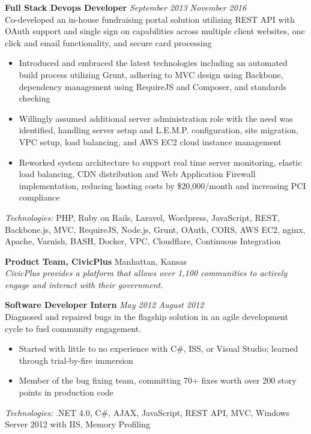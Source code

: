 \documentclass[10pt]{extarticle}
\begin{document}
\begin{addmargin}[1em]{0em}
  \textbf{Full Stack Devops Developer} \hfill \textit{September 2013 \textendash{} November 2016} \\
  Co-developed an in-house fundraising portal solution utilizing REST API with OAuth support and single sign on capabilities across multiple client websites, one click and email functionality, and secure card processing \\
  \vspace{-1.1em}
  \begin{itemize}
    \item Introduced and embraced the latest technologies including an automated build process utilizing Grunt, adhering to MVC design using Backbone, dependency management using RequireJS and Composer, and standards checking
    \item Willingly assumed additional server administration role with the need was identified, handling server setup and L.E.M.P. configuration, site migration, VPC setup, load balancing, and AWS EC2 cloud instance management
    \item Reworked system architecture to support real time server monitoring, elastic load balancing, CDN distribution and Web Application Firewall implementation, reducing hosting costs by \$20,000/month and increasing PCI compliance
  \end{itemize}
  \textit{Technologies:} PHP, Ruby on Rails, Laravel, Wordpress, JavaScript, REST, Backbone.js, MVC, RequireJS, Node.js, Grunt, OAuth, CORS, AWS EC2, nginx, Apache, Varnish, BASH, Docker, VPC, Cloudflare, Continuous Integration
\end{addmargin}
\textbf{Product Team, CivicPlus} \hfill Manhattan, Kansas \\
\textit{CivicPlus provides a platform that allows over 1,100 communities to actively engage and interact with their government.} \\
\begin{addmargin}[1em]{0em}
  \textbf{Software Developer Intern} \hfill \textit{May 2012 \textendash{} August 2012} \\
  Diagnosed and repaired bugs in the flagship solution in an agile development cycle to fuel community engagement. \\
  \vspace{-1.1em}
  \begin{itemize}
    \item Started with little to no experience with C\#, ISS, or Visual Studio; learned through trial-by-fire immersion
    \item Member of the bug fixing team, committing 70+ fixes worth over 200 story points in production code
  \end{itemize}
  \textit{Technologies:} .NET 4.0, C\#, AJAX, JavaScript, REST API, MVC, Windows Server 2012 with IIS, Memory Profiling
\end{addmargin}
\end{document}
